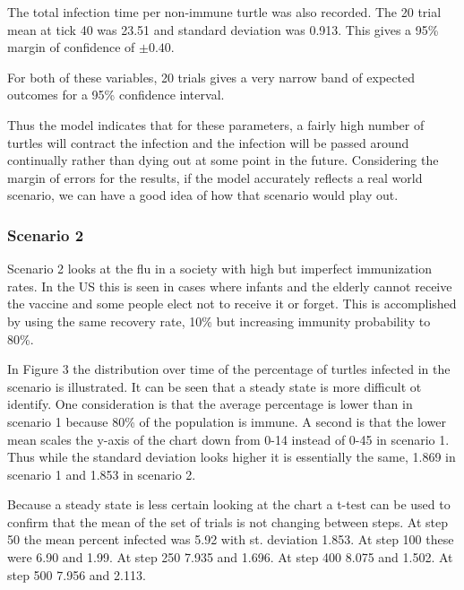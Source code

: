 \documentclass[11pt]{article} %
\begin{document}
The total infection time per non-immune turtle was also recorded. The 20 trial mean at tick 40 was 23.51 and standard deviation was 0.913. This gives a 95\% margin of confidence of $\pm0.40$. 


For both of these variables, 20 trials gives a very narrow band of expected outcomes for a 95\% confidence interval. 


Thus the model indicates that for these parameters, a fairly high number of turtles will contract the infection and the infection will be passed around continually rather than dying out at some point in the future. Considering the margin of errors for the results, if the model accurately reflects a real world scenario, we can have a good idea of how that scenario would play out. 




\subsubsection{Scenario 2}

Scenario 2 looks at the flu in a society with high but imperfect immunization rates. In the US this is seen in cases where infants and the elderly cannot receive the vaccine and some people elect not to receive it or forget. This is accomplished by using the same recovery rate, 10\% but increasing immunity probability to 80\%. 



In Figure 3 the distribution over time of the percentage of turtles infected in the scenario is illustrated. It can be seen that a steady state is more difficult ot identify. One consideration is that the average percentage is lower than in scenario 1 because 80\% of the population is immune. A second is that the lower mean scales the y-axis of the chart down from 0-14 instead of 0-45 in scenario 1. Thus while the standard deviation looks higher it is essentially the same, 1.869 in scenario 1 and 1.853 in scenario 2. 

Because a steady state is less certain looking at the chart a t-test can be used to confirm that the mean of the set of trials is not changing between steps. At step 50 the mean percent infected was 5.92 with st. deviation 1.853. At step 100 these were 6.90 and 1.99. At step 250 7.935 and 1.696. At step 400 8.075 and 1.502. At step 500 7.956 and 2.113. 
\end{document}
